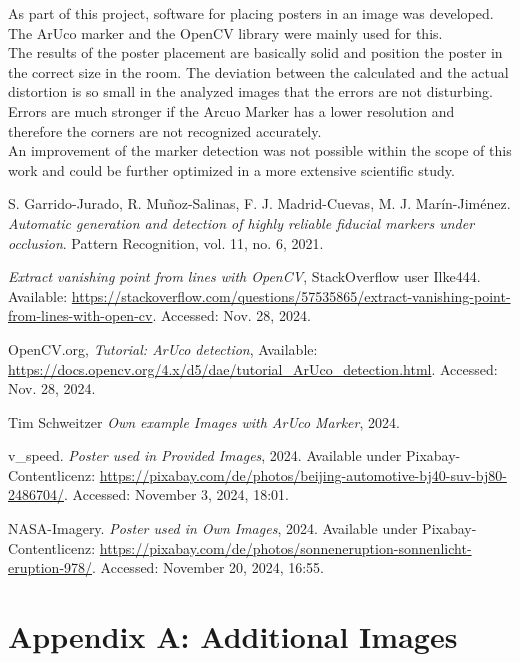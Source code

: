 \documentclass[a4paper,twocolumn]{article}
\begin{document}
As part of this project, software for placing posters in an image was developed. The ArUco marker and the OpenCV library were mainly used for this.
\\
The results of the poster placement are basically solid and position the poster in the correct size in the room. The deviation between the calculated and the actual distortion is so small in the analyzed images that the errors are not disturbing. Errors are much stronger if the Arcuo Marker has a lower resolution and therefore the corners are not recognized accurately.
\\
An improvement of the marker detection was not possible within the scope of this work and could be further optimized in a more extensive scientific study.

\begin{thebibliography}{9}

    S. Garrido-Jurado, R. Muñoz-Salinas, F. J. Madrid-Cuevas, M. J. Marín-Jiménez. 
    \textit{Automatic generation and detection of highly reliable fiducial markers under occlusion}. 
    Pattern Recognition, vol. 11, no. 6, 2021.
    
    \textit{Extract vanishing point from lines with OpenCV}, 
    StackOverflow user Ilke444. Available: \url{https://stackoverflow.com/questions/57535865/extract-vanishing-point-from-lines-with-open-cv}. 
    Accessed: Nov. 28, 2024.

    OpenCV.org, 
    \textit{Tutorial: ArUco detection}, 
    Available: \url{https://docs.opencv.org/4.x/d5/dae/tutorial_ArUco_detection.html}. 
    Accessed: Nov. 28, 2024.

    Tim Schweitzer \textit{Own example Images with ArUco Marker}, 2024.

    v\_speed. \textit{Poster used in Provided Images}, 2024. Available under Pixabay-Contentlicenz: \url{https://pixabay.com/de/photos/beijing-automotive-bj40-suv-bj80-2486704/}. Accessed: November 3, 2024, 18:01.

    NASA-Imagery. \textit{Poster used in Own Images}, 2024. Available under Pixabay-Contentlicenz: \url{https://pixabay.com/de/photos/sonneneruption-sonnenlicht-eruption-978/}. Accessed: November 20, 2024, 16:55.
\end{thebibliography}

\pagebreak

\appendix
\section*{Appendix A: Additional Images}
\end{document}
